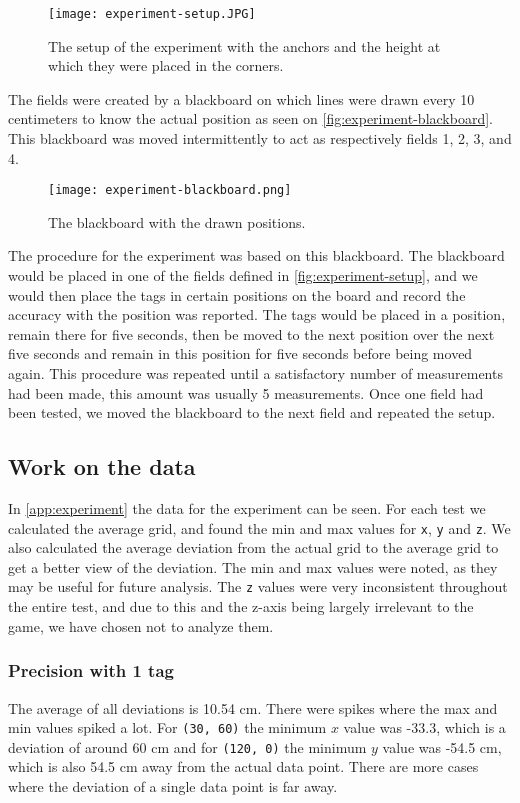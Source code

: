 \begin{figure}[H]
    \centering
    \texttt{[image: experiment-setup.JPG]}
    \caption{The setup of the experiment with the anchors and the height at which they were placed in the corners.}
    \label{fig:experiment-setup}
\end{figure}
\noindent
The fields were created by a blackboard on which lines were drawn every 10 centimeters to know the actual position as seen on \autoref{fig:experiment-blackboard}.
This blackboard was moved intermittently to act as respectively fields 1, 2, 3, and 4.

\begin{figure}[H]
    \centering
    \texttt{[image: experiment-blackboard.png]}
    \caption{The blackboard with the drawn positions.}
    \label{fig:experiment-blackboard}
\end{figure}
\noindent
The procedure for the experiment was based on this blackboard.
The blackboard would be placed in one of the fields defined in \autoref{fig:experiment-setup}, and we would then place the tags in certain positions on the board and record the accuracy with the position was reported.
The tags would be placed in a position, remain there for five seconds, then be moved to the next position over the next five seconds and remain in this position for five seconds before being moved again.
This procedure was repeated until a satisfactory number of measurements had been made, this amount was usually 5 measurements.
Once one field had been tested, we moved the blackboard to the next field and repeated the setup.

\subsection{Work on the data}
In \autoref{app:experiment} the data for the experiment can be seen.
For each test we calculated the average grid, and found the min and max values for \texttt{x}, \texttt{y} and \texttt{z}.
We also calculated the average deviation from the actual grid to the average grid to get a better view of the deviation.
The min and max values were noted, as they may be useful for future analysis.
The \texttt{z} values were very inconsistent throughout the entire test, and due to this and the z-axis being largely irrelevant to the game, we have chosen not to analyze them.

\subsubsection{Precision with 1 tag} 
The average of all deviations is 10.54 cm.
There were spikes where the max and min values spiked a lot.
For \texttt{(30, 60)} the minimum $x$ value was -33.3, which is a deviation of around 60 cm and for \texttt{(120, 0)} the minimum $y$ value was -54.5 cm, which is also 54.5 cm away from the actual data point.
There are more cases where the deviation of a single data point is far away. 

